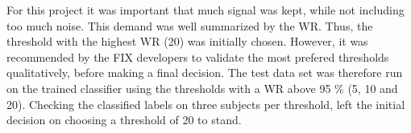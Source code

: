 For this project it was important that much signal was kept, while not including too much noise. This demand was well summarized by the WR. Thus, the threshold with the highest WR (20) was initially chosen. However, it was recommended by the FIX developers to validate the most prefered thresholds qualitatively, before making a final decision. The test data set was therefore run on the trained classifier using the thresholds with a WR above 95 \% (5, 10 and 20). Checking the classified labels on three subjects per threshold, left the initial decision on choosing a threshold of 20 to stand.
